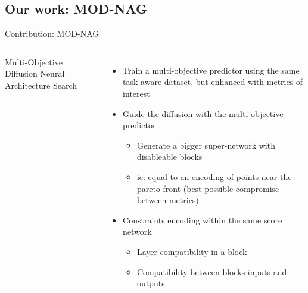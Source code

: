 \documentclass[aspectratio=169,xcolor=dvipsnames]{beamer}
\begin{document}
\subsection{Our work: MOD-NAG}
\begin{frame}{Contribution: MOD-NAG}
    \begin{columns}[c]
        Multi-Objective Diffusion Neural Architecture Search
        \begin{itemize}
            \item Train a multi-objective predictor using the same task aware dataset, but enhanced with metrics of interest
            \item Guide the diffusion with the multi-objective predictor:
                  \begin{itemize}
                      \item Generate a bigger super-network with disableable blocks
                      \item ie: equal to an encoding of points near the pareto front (best possible compromise between metrics)
                  \end{itemize}
            \item Constraints encoding within the same score network
                  \begin{itemize}
                      \item Layer compatibility in a block
                      \item Compatibility between blocks inputs and outputs
                  \end{itemize}
        \end{itemize}


\end{columns}
\end{frame}
\end{document}
